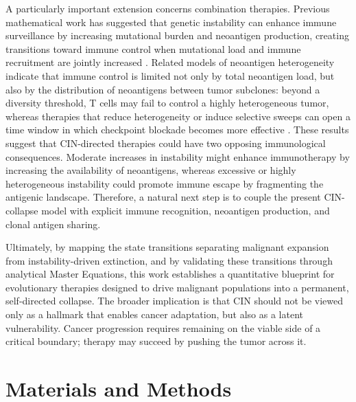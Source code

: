 \documentclass[10pt, aps, rmp,  twocolumn, superscriptaddress, floatfix, showkeys]{revtex4-2}
\begin{document}
A particularly important extension concerns combination therapies. 
Previous mathematical work has suggested that genetic instability 
can enhance immune surveillance by increasing mutational burden and 
neoantigen production, creating transitions toward immune control 
when mutational load and immune recruitment are jointly increased 
\cite{aguade2019genetic,aguade2026tumor}. Related models of neoantigen heterogeneity 
indicate that immune control is limited not only by total neoantigen 
load, but also by the distribution of neoantigens between tumor 
subclones: beyond a diversity threshold, T cells may fail to control
a highly heterogeneous tumor, whereas therapies that reduce 
heterogeneity or induce selective sweeps can open a time window in 
which checkpoint blockade becomes more effective 
\cite{aguade2020tumour,pounraj2024targeting}. These results 
suggest that CIN-directed 
therapies could have two opposing immunological consequences. 
Moderate increases in instability might enhance immunotherapy by 
increasing the availability of neoantigens, whereas excessive or highly 
heterogeneous instability could promote immune escape by fragmenting
the antigenic landscape. Therefore, a natural next step is to couple 
the present CIN-collapse model with explicit immune recognition, 
neoantigen production, and clonal antigen sharing. 

Ultimately, by mapping the state transitions separating malignant 
expansion from instability-driven extinction, and by validating 
these transitions through analytical Master Equations, this work 
establishes a quantitative blueprint for evolutionary therapies 
designed to drive malignant populations into a permanent, self-directed collapse. The broader implication is that CIN should not be 
viewed only as a hallmark that enables cancer adaptation, but also 
as a latent vulnerability. Cancer progression requires remaining on
the viable side of a critical boundary; therapy may succeed by 
pushing the tumor across it.





\section{Materials and Methods}

\end{document}
